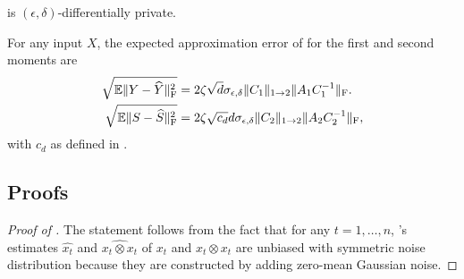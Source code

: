 \begin{theorem}\label{thm:mainprivacy}
 is $(\epsilon, \delta)$-differentially private. 
\end{theorem}

\begin{theorem}\label{thm:main}
For any input $X$, the expected approximation error of  
for the first and second moments are 
\begin{align}
     \sqrt{\mathbb{E}\|Y - \widehat{Y}\|^2_{\text{F}}} &= 2\zeta \sqrt{d} \sigma_{\epsilon, \delta} \|C_1\|_{1 \to 2} \|A_1 C_1^{-1}\|_{\text{F}}.
     \label{eq:JMEquality1} \\
     \sqrt{\mathbb{E}\|S - \widehat{S}\|^2_{\text{F}}} &=2\zeta\sqrt{c_d}  d  \sigma_{\epsilon, \delta} \|C_2\|_{1 \to 2} \|A_2 C_2^{-1}\|_{\text{F}},\label{eq:JMEquality2}
\end{align}
with $c_d$ as defined in . \end{theorem}


\subsection{Proofs}
\begin{proof}[Proof of ]
%
The statement follows from the fact that for any $t=1,\dots,n$,
\acronym's estimates $\widehat{x_t}$ and $\widehat{x_t\otimes x_t}$ 
of $x_t$ and $x_t\otimes x_t$ are unbiased with symmetric noise 
distribution because they are constructed by adding zero-mean 
Gaussian noise.
\end{proof}

